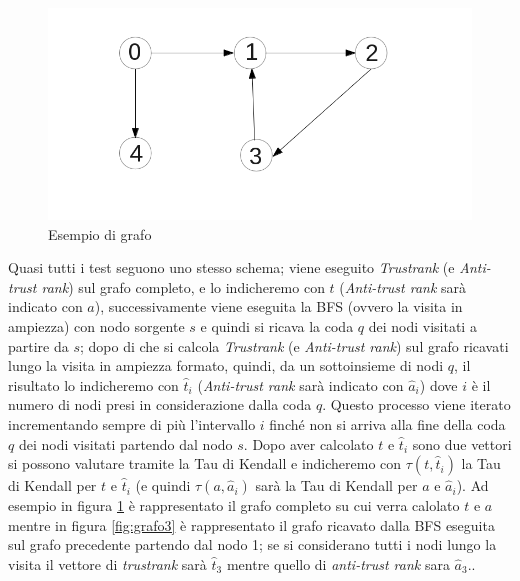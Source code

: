 \begin{figure}
\centering
 \includegraphics{immagini/test/grafoComp}
 \caption{Esempio di grafo}
 \label{fig:grafoComp}
\end{figure}

Quasi tutti i test seguono uno stesso schema; viene eseguito \textit{Trustrank} (e \textit{Anti-trust rank}) sul grafo completo, e lo indicheremo con \(t\) (\textit{Anti-trust rank} sarà indicato con \(a\)), successivamente viene eseguita la BFS (ovvero la visita in ampiezza) con nodo sorgente \(s\) e quindi si ricava la coda \(q\) dei nodi visitati a partire da \(s\); dopo di che si calcola \textit{Trustrank} (e \textit{Anti-trust rank}) sul grafo ricavati lungo la visita in ampiezza formato, quindi, da un sottoinsieme di nodi \(q\), il risultato lo indicheremo con \(\hat{t}_i\) (\textit{Anti-trust rank} sarà indicato con \(\hat{a}_i\)) dove \(i\) è il numero di nodi presi in considerazione dalla coda \(q\). Questo processo viene iterato incrementando sempre di più l'intervallo \(i\) finché non si arriva alla fine della coda \(q\) dei nodi visitati partendo dal nodo \(s\). Dopo aver calcolato \(t\) e \(\hat{t}_i\) sono due vettori si possono valutare tramite la Tau di Kendall e indicheremo con \(\tau(t,\hat{
t}_i)\) la Tau di Kendall per \(t\) e \(\hat{t}_i\)  (e quindi \(\tau(a,\hat{a}_i)\) sarà la Tau di Kendall per \(a\) e \(\hat{a}_i\)). Ad esempio in figura \ref{fig:grafoComp} è rappresentato il grafo completo su cui verra calolato \(t\) e \(a\) mentre in figura \ref{fig:grafo3} è rappresentato il grafo ricavato dalla BFS eseguita sul grafo precedente partendo dal nodo 1; se si considerano tutti i nodi lungo la visita il vettore di \textit{trustrank} sarà \(\hat{t}_3\) mentre quello di \textit{anti-trust rank} sara \(\hat{a}_3\)..


